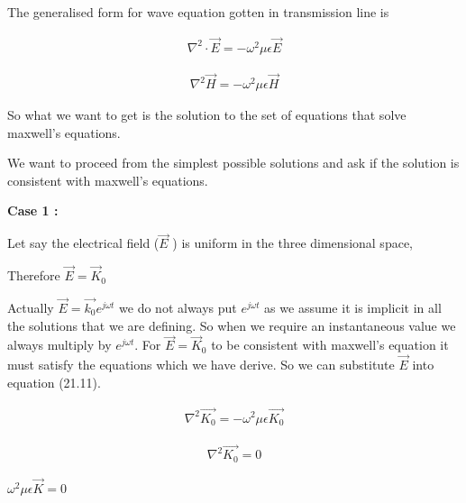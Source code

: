 		The generalised form for wave equation gotten in transmission line is
		
		\bigskip
		
		\begin{align}
		\nabla^2\cdot\vec{E}=-\omega^2\mu\epsilon\vec{E}
		\end{align}
		
		\begin{align}
			\nabla^2\vec{H}=-\omega^2\mu\epsilon\vec{H}
		\end{align}
		
		\bigskip
		
		So what we want to get is the solution to the set of equations that solve maxwell's equations.
		
		\bigskip
		
		We want to proceed from the simplest possible solutions and  ask if the solution is consistent with maxwell's equations.
		
		\bigskip
		
		\textbf{Case 1 :}
		
		\bigskip
		
		Let say the electrical field ($\vec{E}$ ) is uniform in the three dimensional space,
		
		\bigskip
		
		Therefore $\vec{E}=\vec{K}_{0}$
		
		\bigskip
		
		Actually $\vec{E}=\vec{k_{0}}e^{j\omega t}$ we do not always put  $e^{j\omega t}$ as we assume it is implicit in all the solutions that we are defining. So when we require an instantaneous value we always multiply by $e^{j\omega t}$. For $\vec{E}=\vec{K}_{0}$ to be consistent with maxwell's equation it must satisfy the  equations which we have derive. So we can substitute $\vec{E}$ into equation (21.11).
		
		\bigskip
		
		\begin{align}
			\nabla^2\vec{K_{0}}=-\omega^2\mu\epsilon\vec{K_{0}}
		\end{align}
		
		
		
		\bigskip
		\begin{align}
			\nabla^2\vec{K_{0}}=0
		\end{align}
	
		
		\bigskip
		
		$\omega^2\mu\epsilon\vec{K}=0$
		
		\bigskip
		
